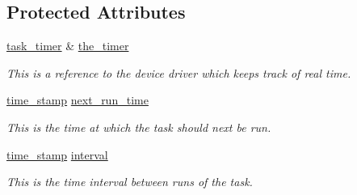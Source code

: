\subsection*{Protected Attributes}
\begin{DoxyCompactItemize}
\item 
\hypertarget{classstl__task_a8db004322eb55d27196c332bbd1d9c4c}{\hyperlink{classtask__timer}{task\-\_\-timer} \& \hyperlink{classstl__task_a8db004322eb55d27196c332bbd1d9c4c}{the\-\_\-timer}}\label{classstl__task_a8db004322eb55d27196c332bbd1d9c4c}

\begin{DoxyCompactList}\small\item\em This is a reference to the device driver which keeps track of real time. \end{DoxyCompactList}\item 
\hypertarget{classstl__task_add87ffb2cc0649d4b3d291323c2fe47b}{\hyperlink{classtime__stamp}{time\-\_\-stamp} \hyperlink{classstl__task_add87ffb2cc0649d4b3d291323c2fe47b}{next\-\_\-run\-\_\-time}}\label{classstl__task_add87ffb2cc0649d4b3d291323c2fe47b}

\begin{DoxyCompactList}\small\item\em This is the time at which the task should next be run. \end{DoxyCompactList}\item 
\hypertarget{classstl__task_afecb442fa869e15d3c82efc19a041abe}{\hyperlink{classtime__stamp}{time\-\_\-stamp} \hyperlink{classstl__task_afecb442fa869e15d3c82efc19a041abe}{interval}}\label{classstl__task_afecb442fa869e15d3c82efc19a041abe}

\begin{DoxyCompactList}\small\item\em This is the time interval between runs of the task. \end{DoxyCompactList}\end{DoxyCompactItemize}


